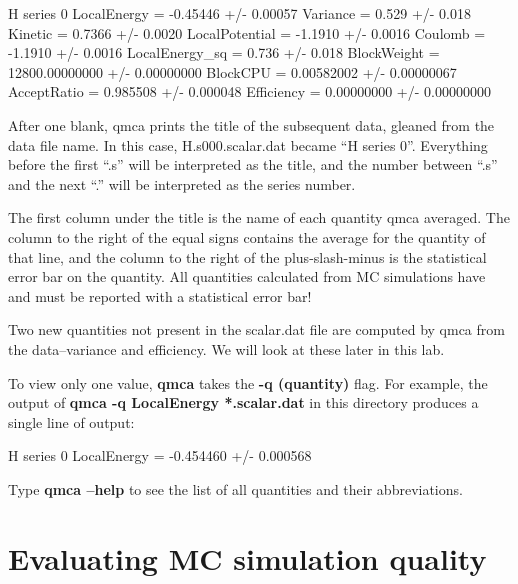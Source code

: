 \begin{shade}

H  series 0 
LocalEnergy           =          -0.45446 +/-          0.00057
Variance              =             0.529 +/-            0.018 
Kinetic               =            0.7366 +/-           0.0020
LocalPotential        =           -1.1910 +/-           0.0016
Coulomb               =           -1.1910 +/-           0.0016 
LocalEnergy_sq        =             0.736 +/-            0.018
BlockWeight           =    12800.00000000 +/-       0.00000000
BlockCPU              =        0.00582002 +/-       0.00000067 
AcceptRatio           =          0.985508 +/-         0.000048
Efficiency            =        0.00000000 +/-       0.00000000 
\end{shade}

After one blank, qmca prints the title of the subsequent data, gleaned from the
data file name.  In this case, H.s000.scalar.dat became ``H  series 0''.
Everything before the first ``.s'' will be interpreted as the title, and the
number between ``.s'' and the next ``.'' will be interpreted as the series
number. 

The first column under the title is the name of each quantity qmca averaged.
The column to the right of the equal signs contains the average for the
quantity of that line, and the column to the right of the plus-slash-minus is
the statistical error bar on the quantity.  All quantities calculated from MC
simulations have and must be reported with a statistical error bar!

Two new quantities not present in the scalar.dat file are computed by qmca from
the data--variance and efficiency.  We will look at these later in this lab. 

To view only one value, \textbf{qmca} takes the \textbf{-q (quantity)} flag.
For example, the output of \textbf{qmca -q LocalEnergy *.scalar.dat} in this
directory produces a single line of output:

\begin{shade} 
H  series 0  LocalEnergy = -0.454460 +/- 0.000568 
\end{shade}

Type \textbf{qmca --help} to see the list of all quantities and their
abbreviations.

\section{Evaluating MC simulation quality}

